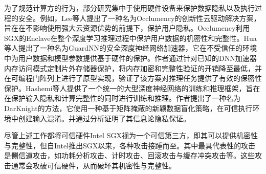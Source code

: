 为了规范计算方的行为，部分研究集中于使用硬件设备来保护数据隐私以及执行过程的安全。例如，Lee等人\cite{lee2019occlumency}提出了一种名为Occlumency的创新性云驱动解决方案，旨在在不影响使用强大云资源优势的前提下，保护用户隐私。Occlumency利用SGX的Enclave在整个深度学习推理过程中保护用户数据的机密性和完整性。Hua等人\cite{hua2020guardnn}提出了一种名为GuardNN的安全深度神经网络加速器，它在不受信任的环境中为用户数据和模型参数提供基于硬件的保护。作者通过针对已知的DNN加速器内存访问模式定制片外存储器保护，将内存加密和完整性验证的开销降至最低，并在可编程门阵列上进行了原型实现，验证了该方案对推理任务提供了有效的保密性保护。Hashemi等人\cite{hashemi2020darknight}提供了一个统一的大型深度神经网络的训练和推理框架，旨在在保护输入隐私和计算完整性的同时进行训练和推理。作者提出了一种名为DarKnight的方法，它使用一种基于矩阵掩蔽的新颖数据盲化策略，在可信执行环境中创建输入混淆。并通过分析证明了其信息论隐私保证。

尽管上述工作都将可信硬件Intel SGX视为一个可信第三方，即其可以提供机密性与完整性，但自Intel推出SGX以来，各种攻击接踵而至。其中最具代表性的攻击是侧信道攻击，如功耗分析攻击、计时攻击、回滚攻击与缓存冲突攻击等\cite{SGX_Exposure, High_Resolution_Side_Channels, Cache_Attack_SGX, CacheZoom, SGX_Cache, mem_side_hazard, PMFaultFA, VoltJockeyAN}。这些攻击通常会攻破可信硬件，从而破坏其机密性与完整性。

%
%
%



